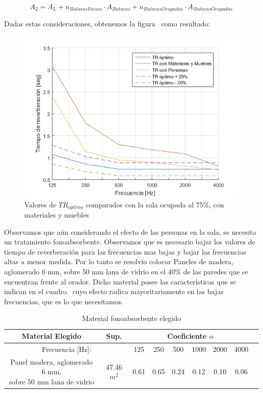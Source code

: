 \begin{equation}
    A_2 = A_L + n_{ButacasVacias} \cdot A_{Butacas} + n_{ButacasOcupadas} \cdot A_{ButacasOcupadas}
\end{equation}

\par Dadas estas consideraciones, obtenemos la figura~ como resultado:

\begin{figure}[H]
	\centering
	\includegraphics[width=1\textwidth]{./img/TR_conMat_MueblesYPersonas.png}
	\caption{Valores de $TR_{optimo}$ comparados con la sala ocupada al 75\%, con materiales y muebles}
	\label{fig:TR_optimosYtolerancia}
\end{figure}

\par Observamos que aún considerando el efecto de las personas en la sala, se necesita un tratamiento fonoabsorbente. Observamos que es necesario bajar los valores de tiempo de reverberación para las frecuencias mas bajas y bajar las frecuencias altas a menor medida. Por lo tanto se resolvio colocar Paneles de madera, aglomerado 6 mm, sobre 50 mm lana de vidrio en el 40\% de las paredes que se encuentran frente al orador. Dicho material posee las características que se indican en el cuadro~ cuyo efecto radica mayoritariamente en las bajas frecuencias, que es lo que necesitamos.

\begin{table}[h]
    \centering
    \begin{tabular}{|c|c|c||c|c|c|c|c|c|} \hline
         Material Elegido & Sup. & \multicolumn{6}{|c|}{Coeficiente $\alpha$} \\ \hline
        \multicolumn{2}{|c|}{Frecuencia [Hz]:} & 125 & 250 & 500 & 1000 & 2000 & 4000 \\ \hline
        \makecell{Panel madera, aglomerado 6 mm,\\ sobre 50 mm lana de vidrio} & 47.46$m^2$ & 0.61 &0.65&0.24&0.12&0.10&0.06 \\ \hline     
    \end{tabular}
    \caption{Material fonoabsorbente elegido}
    \label{tab:datos_mat_fonoabsorbente}
\end{table}

